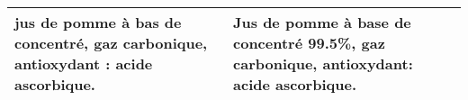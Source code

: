 \begin{tabular}{p{7cm}p{7cm}}
                                                                                                                                                                                                                                                                                                                                                                                                                                                                                                                                                                                                                                                                                                                                                                                                                                                                                                                                                                                                                                                                                                                                                                                                                                                                                                                                                                                                                                                                                                                                                                                                                                    jus de pomme à bas de concentré, gaz carbonique, antioxydant : acide ascorbique. &                                                                                                                                                                                                                                                                                                                                                                                                                                                                       Jus de pomme à base de concentré 99.5\%, gaz carbonique, antioxydant: acide ascorbique. \\
\bottomrule
\end{tabular}
